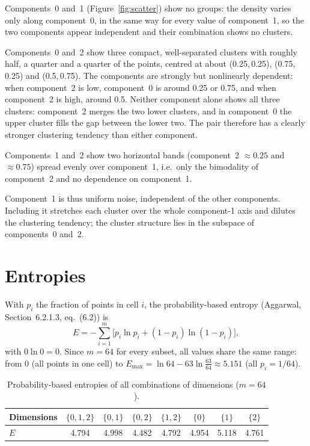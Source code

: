 \documentclass[a4paper,12pt]{article}
\begin{document}
Components~0 and~1 (Figure~\ref{fig:scatter}) show no groups: the density
varies only along component~0, in the same way for every value of
component~1, so the two components appear independent and their
combination shows no clusters.

Components~0 and~2 show three compact, well-separated clusters with roughly
half, a quarter and a quarter of the points, centred at about
(0.25,\,0.25), (0.75,\,0.25) and (0.5,\,0.75). The components are strongly but
nonlinearly dependent: when component~2 is low, component~0 is around 0.25
or 0.75, and when component~2 is high, around 0.5. Neither component alone
shows all three clusters: component~2 merges the two lower clusters, and in
component~0 the upper cluster fills the gap between the lower two. The pair
therefore has a clearly stronger clustering tendency than either component.

Components~1 and~2 show two horizontal bands (component~2 $\approx0.25$ and
$\approx0.75$) spread evenly over component~1, i.e.\ only the bimodality of
component~2 and no dependence on component~1.

Component~1 is thus uniform noise, independent of the other components.
Including it stretches each cluster over the whole component-1 axis and
dilutes the clustering tendency; the cluster structure lies in the subspace
of components~0 and~2.

\section{Entropies}

With $p_i$ the fraction of points in cell $i$, the probability-based
entropy (Aggarwal, Section~6.2.1.3, eq.~(6.2)) is
\[
  E=-\sum_{i=1}^{m}\bigl[p_i\ln p_i+(1-p_i)\ln(1-p_i)\bigr],
\]
with $0\ln0=0$. Since $m=64$ for every subset, all values share the same
range: from 0 (all points in one cell) to
$E_{\max}=\ln64-63\ln\frac{63}{64}\approx5.151$ (all $p_i=1/64$).

\begin{table}[!ht]
\centering
\caption{Probability-based entropies of all combinations of dimensions ($m=64$).}
\label{tab:entropies}
\begin{tabular}{lccccccc}
\toprule
Dimensions & $\{0,1,2\}$ & $\{0,1\}$ & $\{0,2\}$ & $\{1,2\}$ & $\{0\}$ & $\{1\}$ & $\{2\}$ \\
\midrule
$E$ & 4.794 & 4.998 & 4.482 & 4.792 & 4.954 & 5.118 & 4.761 \\
\bottomrule
\end{tabular}
\end{table}
\end{document}
